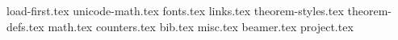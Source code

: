 
{load-first.tex}
{unicode-math.tex}
{fonts.tex}
{links.tex}
{theorem-styles.tex}
{theorem-defs.tex}
{math.tex}
{counters.tex}
{bib.tex}
{misc.tex}
{beamer.tex}
{project.tex}
